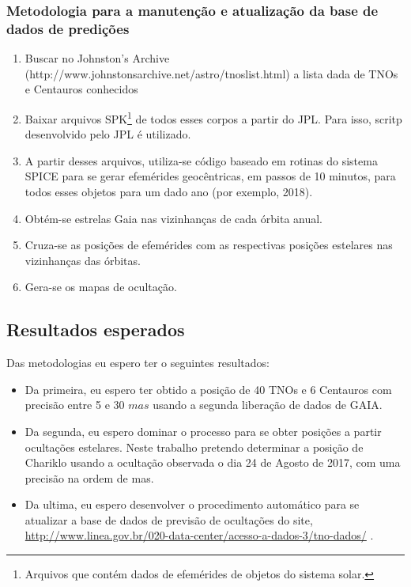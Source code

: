 \documentclass[a4paper, 11pt]{article}
\begin{document}
\subsubsection{Metodologia para a manuten\c c\~ao e atualiza\c c\~ao da base de dados de predi\c c\~oes}
\begin{enumerate}
  \item Buscar no Johnston's Archive (http://www.johnstonsarchive.net/astro/tnoslist.html) a lista dada de TNOs e Centauros conhecidos
  \item Baixar arquivos SPK\footnote{Arquivos que cont\'em dados de efem\'erides de objetos do sistema solar.} de todos esses corpos a partir do JPL. Para isso, scritp desenvolvido pelo JPL \'e utilizado.
  \item A partir desses arquivos, utiliza-se c\'odigo baseado em rotinas do sistema SPICE para se gerar efem\'erides geoc\^entricas, em passos de 10 minutos, para todos esses objetos para um dado ano (por exemplo, 2018).
  \item Obt\'em-se estrelas Gaia nas vizinhan\c cas de cada \'orbita anual.
  \item Cruza-se as posi\c c\~oes de efem\'erides com as respectivas posi\c c\~oes estelares nas vizinhan\c cas das \'orbitas.
  \item Gera-se os mapas de oculta\c c\~ao.
\end{enumerate}

\subsection{Resultados esperados}

Das metodologias eu espero ter o seguintes resultados:
\begin{itemize}
  \item Da primeira, eu espero ter obtido a posição de 40 TNOs e 6 Centauros com precisão entre 5 e 30 $mas$ usando a segunda liberação de dados de GAIA.
  \item Da segunda, eu espero dominar o processo para se obter posições a partir ocultações estelares. Neste trabalho pretendo determinar a posição de Chariklo usando a ocultação observada o dia 24 de Agosto de 2017, com uma precisão na ordem de mas. 
  \item Da ultima, eu espero desenvolver o procedimento automático para se atualizar a base de dados de previsão de ocultações do site,  \url{http://www.linea.gov.br/020-data-center/acesso-a-dados-3/tno-dados/} .    
\end{itemize}
\end{document}
